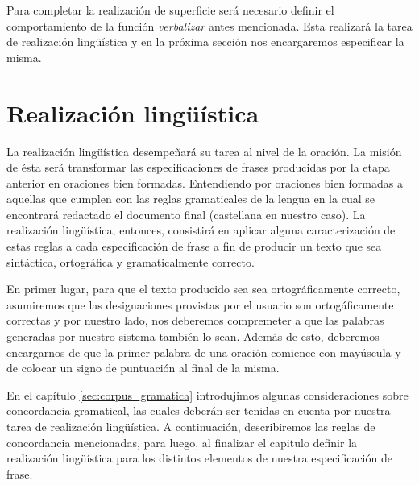 Para completar la realización de superficie será necesario definir el comportamiento de la función \emph{verbalizar} antes mencionada. Esta realizará la tarea de realización lingüística y en la próxima sección nos encargaremos especificar la misma.





\section{Realización lingüística}
\label{cap:linguistic_realization}

La realización lingüística desempeñará su tarea al nivel de la oración. La misión de ésta será transformar las especificaciones de frases producidas por la etapa anterior en oraciones bien formadas. Entendiendo por oraciones bien formadas a aquellas que cumplen con las reglas gramaticales de la lengua en la cual se encontrará redactado el documento final (castellana en nuestro caso). La realización lingüística, entonces, consistirá en aplicar alguna caracterización de estas reglas a cada especificación de frase a fin de producir un texto que sea sintáctica, ortográfica y gramaticalmente correcto.

En primer lugar, para que el texto producido sea sea ortográficamente correcto, asumiremos que las designaciones provistas por el usuario son ortogáficamente correctas y por nuestro lado, nos deberemos compremeter a que las palabras generadas por nuestro sistema también lo sean. Además de esto, deberemos encargarnos de que la primer palabra de una oración comience con mayúscula y de colocar un signo de puntuación al final de la misma.

En el capítulo \ref{sec:corpus_gramatica} introdujimos algunas consideraciones sobre concordancia gramatical, las cuales deberán ser tenidas en cuenta por nuestra tarea de realización lingüística. A continuación, describiremos las reglas de concordancia mencionadas, para luego, al finalizar el capitulo definir la realización lingüística para los distintos elementos de nuestra especificación de frase.


